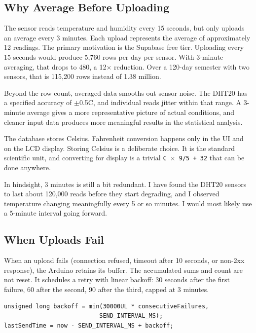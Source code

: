 \documentclass[11pt, letterpaper]{article}
\begin{document}
\subsection{Why Average Before Uploading}

The sensor reads temperature and humidity every 15 seconds, but only uploads an average every 3 minutes. Each upload represents the average of approximately 12 readings. The primary motivation is the Supabase free tier. Uploading every 15 seconds would produce 5,760 rows per day per sensor. With 3-minute averaging, that drops to 480, a 12$\times$ reduction. Over a 120-day semester with two sensors, that is 115,200 rows instead of 1.38 million.

Beyond the row count, averaged data smooths out sensor noise. The DHT20 has a specified accuracy of $\pm$0.5\textdegree C, and individual reads jitter within that range. A 3-minute average gives a more representative picture of actual conditions, and cleaner input data produces more meaningful results in the statistical analysis.

The database stores Celsius. Fahrenheit conversion happens only in the UI and on the LCD display. Storing Celsius is a deliberate choice. It is the standard scientific unit, and converting for display is a trivial \texttt{C $\times$ 9/5 + 32} that can be done anywhere.

In hindsight, 3 minutes is still a bit redundant. I have found the DHT20 sensors to last about 120,000 reads before they start degrading, and I observed temperature changing meaningfully every 5 or so minutes. I would most likely use a 5-minute interval going forward.

\subsection{When Uploads Fail}

When an upload fails (connection refused, timeout after 10 seconds, or non-2xx response), the Arduino retains its buffer. The accumulated sums and count are not reset. It schedules a retry with linear backoff: 30 seconds after the first failure, 60 after the second, 90 after the third, capped at 3 minutes.

\begin{lstlisting}
unsigned long backoff = min(30000UL * consecutiveFailures,
                           SEND_INTERVAL_MS);
lastSendTime = now - SEND_INTERVAL_MS + backoff;
\end{lstlisting}
\end{document}
